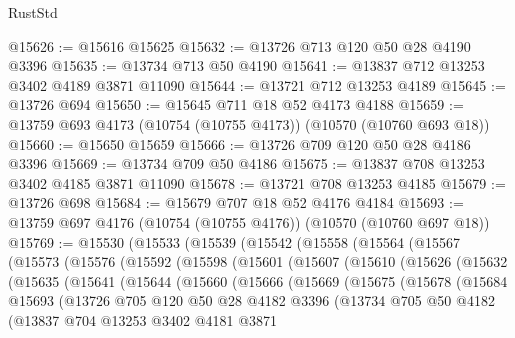 \begin{lexlean}{RustStd}
\begin{coremodule}
@15626 := @15616 @15625
@15632 := @13726 @713 @120 @50 @28 @4190 @3396
@15635 := @13734 @713 @50 @4190
@15641 := @13837 @712 @13253 @3402 @4189 @3871 @11090
@15644 := @13721 @712 @13253 @4189
@15645 := @13726 @694
@15650 := @15645 @711 @18 @52 @4173 @4188
@15659 := @13759 @693 @4173 (@10754 (@10755 @4173)) (@10570 (@10760 @693 @18))
@15660 := @15650 @15659
@15666 := @13726 @709 @120 @50 @28 @4186 @3396
@15669 := @13734 @709 @50 @4186
@15675 := @13837 @708 @13253 @3402 @4185 @3871 @11090
@15678 := @13721 @708 @13253 @4185
@15679 := @13726 @698
@15684 := @15679 @707 @18 @52 @4176 @4184
@15693 := @13759 @697 @4176 (@10754 (@10755 @4176)) (@10570 (@10760 @697 @18))
@15769 := @15530
    (@15533
      (@15539
        (@15542
          (@15558
            (@15564
              (@15567
                (@15573
                  (@15576
                    (@15592
                      (@15598
                        (@15601
                          (@15607
                            (@15610
                              (@15626
                                (@15632
                                  (@15635
                                    (@15641
                                      (@15644
                                        (@15660
                                          (@15666
                                            (@15669
                                              (@15675
                                                (@15678
                                                  (@15684
                                                    @15693
                                                    (@13726
                                                      @705
                                                      @120
                                                      @50
                                                      @28
                                                      @4182
                                                      @3396
                                                      (@13734
                                                        @705
                                                        @50
                                                        @4182
                                                        (@13837
                                                          @704
                                                          @13253
                                                          @3402
                                                          @4181
                                                          @3871

\end{coremodule}
\end{lexlean}
